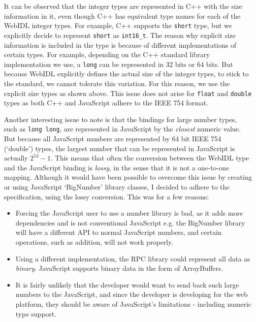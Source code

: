 It can be observed that the integer types are represented in C++ with the size information in it, even though C++ has equivalent type names for each of the WebIDL integer types. For example, C++ supports the \lstinline{short} type, but we explicitly decide to represent \lstinline{short} as \lstinline{int16_t}. The reason why explicit size information is included in the type is because of different implementations of certain types. For example, depending on the C++ standard library implementation we use, a \lstinline{long} can be represented in 32 bits or 64 bits. But because WebIDL explicitly defines the actual size of the integer types, to stick to the standard, we cannot tolerate this variation. For this reason, we use the explicit size types as shown above. This issue does not arise for \lstinline{float} and \lstinline{double} types as both C++ and JavaScript adhere to the IEEE 754 format.

Another interesting issue to note is that the bindings for large number types, such as \lstinline{long long}, are represented in JavaScript by the \emph{closest} numeric value. But because all JavaScript numbers are represented by 64 bit IEEE 754 (`double') types, the largest number that can be represented in JavaScript is actually $2^{53}-1$. This means that often the conversion between the WebIDL type and the JavaScript binding is \emph{lossy}, in the sense that it is not a one-to-one mapping. Although it would have been possible to overcome this issue by creating or using JavaScript `BigNumber' library classes, I decided to adhere to the specification, using the lossy conversion. This was for a few reasons:

\begin{itemize}
	\item Forcing the JavaScript user to use a number library is bad, as it adds more dependencies and is not conventional JavaScript e.g. the BigNumber library will have a different API to normal JavaScript numbers, and certain operations, such as addition, will not work properly.
	\item Using a different implementation, the RPC library could represent all data as \emph{binary}. JavaScript supports binary data in the form of ArrayBuffers.
	\item It is fairly unlikely that the developer would want to send back such large numbers to the JavaScript, and since the developer is developing for the web platform, they should be aware of JavaScript's limitations - including numeric type support.
\end{itemize}

